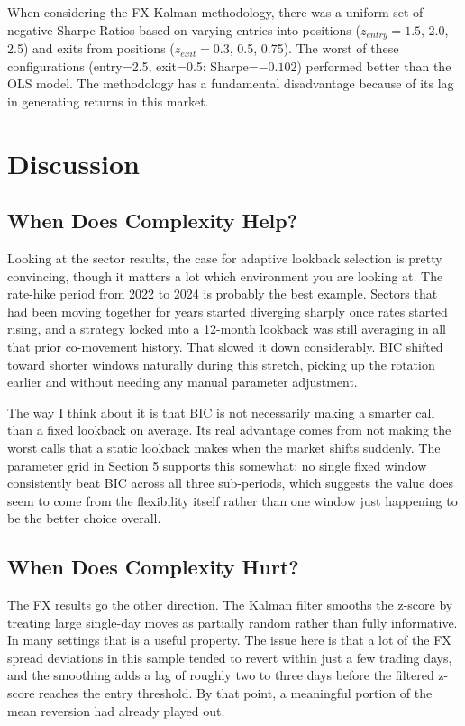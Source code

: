 \documentclass[12pt]{article}
\begin{document}
When considering the FX Kalman methodology, there was a uniform set of negative Sharpe Ratios based on varying entries into positions ($z_{entry} = 1.5$, 2.0, 2.5) and exits from positions ($z_{exit} = 0.3$, 0.5, 0.75). The worst of these configurations (entry=2.5, exit=0.5: Sharpe=$-0.102$) performed better than the OLS model. The methodology has a fundamental disadvantage because of its lag in generating returns in this market.

\section{Discussion}

\subsection{When Does Complexity Help?}

Looking at the sector results, the case for adaptive lookback selection is pretty convincing, though it matters a lot which environment you are looking at. The rate-hike period from 2022 to 2024 is probably the best example. Sectors that had been moving together for years started diverging sharply once rates started rising, and a strategy locked into a 12-month lookback was still averaging in all that prior co-movement history. That slowed it down considerably. BIC shifted toward shorter windows naturally during this stretch, picking up the rotation earlier and without needing any manual parameter adjustment.

The way I think about it is that BIC is not necessarily making a smarter call than a fixed lookback on average. Its real advantage comes from not making the worst calls that a static lookback makes when the market shifts suddenly. The parameter grid in Section 5 supports this somewhat: no single fixed window consistently beat BIC across all three sub-periods, which suggests the value does seem to come from the flexibility itself rather than one window just happening to be the better choice overall.

\subsection{When Does Complexity Hurt?}

The FX results go the other direction. The Kalman filter smooths the z-score by treating large single-day moves as partially random rather than fully informative. In many settings that is a useful property. The issue here is that a lot of the FX spread deviations in this sample tended to revert within just a few trading days, and the smoothing adds a lag of roughly two to three days before the filtered z-score reaches the entry threshold. By that point, a meaningful portion of the mean reversion had already played out.
\end{document}
